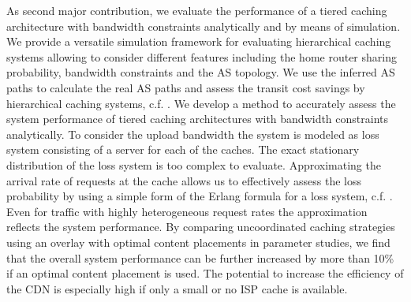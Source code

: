 As second major contribution, we evaluate the performance of a tiered caching architecture with bandwidth constraints analytically and by means of simulation.
We provide a versatile simulation framework for evaluating hierarchical caching systems allowing to consider different features including the home router sharing probability, bandwidth constraints and the AS topology.
We use the inferred AS paths to calculate the real AS paths and assess the transit cost savings by hierarchical caching systems, c.f. \cite{lareida2015augmenting,rbhorst-demo}.
We develop a method to accurately assess the system performance of tiered caching architectures with bandwidth constraints analytically.
To consider the upload bandwidth the system is modeled as loss system consisting of a server for each of the caches.
The exact stationary distribution of the loss system is too complex to evaluate.
Approximating the arrival rate of requests at the cache allows us to effectively assess the loss probability by using a simple form of the Erlang formula for a loss system, c.f. \cite{burger2016hierarchical}.
Even for traffic with highly heterogeneous request rates the approximation reflects the system performance.
By comparing uncoordinated caching strategies using an overlay with optimal content placements in parameter studies, we find that the overall system performance can be further increased by more than 10\% if an optimal content placement is used.
The potential to increase the efficiency of the CDN is especially high if only a small or no ISP cache is available.

